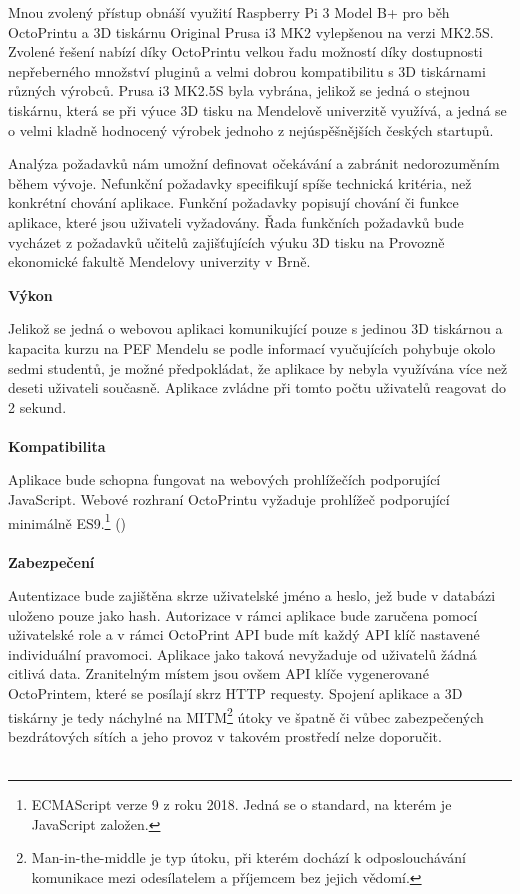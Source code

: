 \documentclass[twoside, 12pt]{article}
\begin{document}
Mnou zvolený přístup obnáší využití Raspberry Pi 3 Model B+ pro běh OctoPrintu a 3D tiskárnu Original Prusa i3 MK2 vylepšenou na verzi MK2.5S. Zvolené řešení nabízí díky OctoPrintu velkou řadu možností díky dostupnosti nepřeberného množství pluginů a velmi dobrou kompatibilitu s 3D tiskárnami různých výrobců. Prusa i3 MK2.5S byla vybrána, jelikož se jedná o stejnou tiskárnu, která se při výuce 3D tisku na Mendelově univerzitě využívá, a jedná se o velmi kladně hodnocený výrobek jednoho z nejúspěšnějších českých startupů.


Analýza požadavků nám umožní definovat očekávání a zabránit nedorozuměním během vývoje. Nefunkční požadavky specifikují spíše technická kritéria, než konkrétní chování aplikace. Funkční požadavky popisují chování či funkce aplikace, které jsou uživateli vyžadovány. Řada funkčních požadavků bude vycházet z požadavků učitelů zajišťujících výuku 3D tisku na Provozně ekonomické fakultě Mendelovy univerzity v Brně.


\textbf{Výkon}

Jelikož se jedná o webovou aplikaci komunikující pouze s jedinou 3D tiskárnou a kapacita kurzu na PEF Mendelu se podle informací vyučujících pohybuje okolo sedmi studentů, je možné předpokládat, že aplikace by nebyla využívána více než deseti uživateli současně. Aplikace zvládne při tomto počtu uživatelů reagovat do 2 sekund.
\\
\\
\textbf{Kompatibilita}

Aplikace bude schopna fungovat na webových prohlížečích podporující JavaScript. Webové rozhraní OctoPrintu vyžaduje prohlížeč podporující minimálně ES9.\footnote{ECMAScript verze 9 z roku 2018. Jedná se o standard, na kterém je JavaScript založen.} (\cite{OctoPrintBrowserCheck})
\\
\\
\textbf{Zabezpečení}

Autentizace bude zajištěna skrze uživatelské jméno a heslo, jež bude v databázi uloženo pouze jako hash. Autorizace v rámci aplikace bude zaručena pomocí uživatelské role a v rámci OctoPrint API bude mít každý API klíč nastavené individuální pravomoci. Aplikace jako taková nevyžaduje od uživatelů žádná citlivá data. Zranitelným místem jsou ovšem API klíče vygenerované OctoPrintem, které se posílají skrz HTTP requesty. Spojení aplikace a 3D tiskárny je tedy náchylné na MITM\footnote{Man-in-the-middle je typ útoku, při kterém dochází k odposlouchávání komunikace mezi odesílatelem a příjemcem bez jejich vědomí.} útoky ve špatně či vůbec zabezpečených bezdrátových sítích a jeho provoz v takovém prostředí nelze doporučit.
\\
\\
\end{document}
